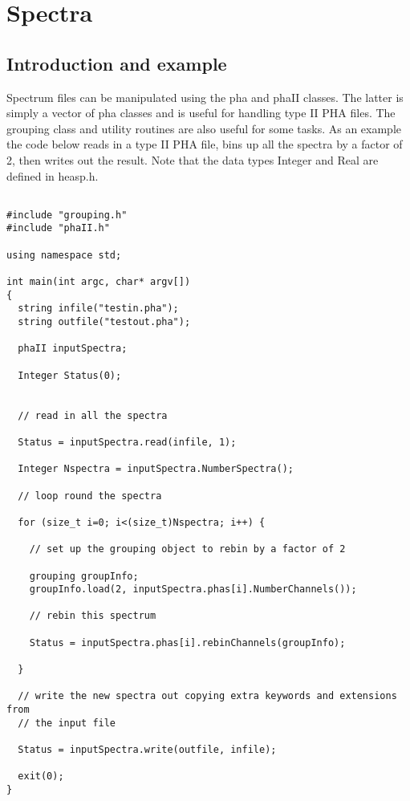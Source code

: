 \documentclass[11pt]{book}
\begin{document}
\section{Spectra}

\subsection{Introduction and example}

Spectrum files can be manipulated using the pha and phaII classes. The
latter is simply a vector of pha classes and is useful for handling
type II PHA files. The grouping class and utility routines are also
useful for some tasks. As an example the code below reads in a type II
PHA file, bins up all the spectra by a factor of 2, then writes out
the result. Note that the data types Integer and Real are defined in heasp.h.

\begin{verbatim}

#include "grouping.h"
#include "phaII.h"

using namespace std;

int main(int argc, char* argv[])
{
  string infile("testin.pha");
  string outfile("testout.pha");

  phaII inputSpectra;

  Integer Status(0);


  // read in all the spectra

  Status = inputSpectra.read(infile, 1);

  Integer Nspectra = inputSpectra.NumberSpectra();

  // loop round the spectra

  for (size_t i=0; i<(size_t)Nspectra; i++) {

    // set up the grouping object to rebin by a factor of 2

    grouping groupInfo;
    groupInfo.load(2, inputSpectra.phas[i].NumberChannels());

    // rebin this spectrum

    Status = inputSpectra.phas[i].rebinChannels(groupInfo);

  }

  // write the new spectra out copying extra keywords and extensions from
  // the input file

  Status = inputSpectra.write(outfile, infile);

  exit(0);
}
\end{verbatim}
\end{document}
